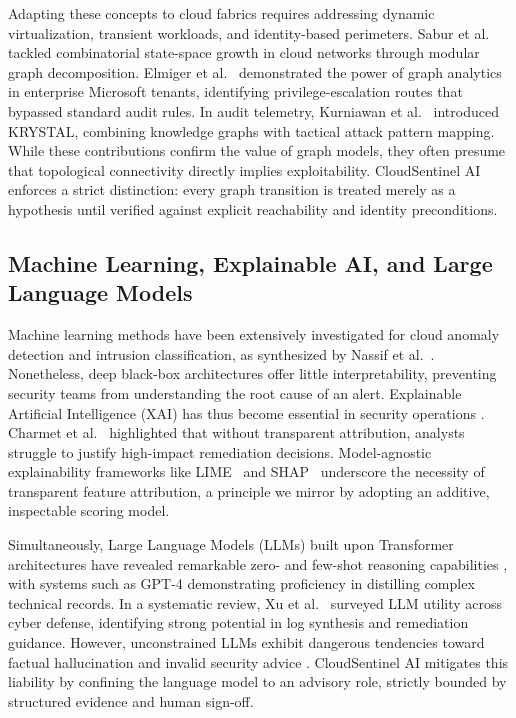 \documentclass[conference]{IEEEtran}
\begin{document}
Adapting these concepts to cloud fabrics requires addressing dynamic virtualization, transient workloads, and identity-based perimeters. Sabur et al.~\cite{sabur2022scalable} tackled combinatorial state-space growth in cloud networks through modular graph decomposition. Elmiger et al.~\cite{elmiger2023attackpaths} demonstrated the power of graph analytics in enterprise Microsoft tenants, identifying privilege-escalation routes that bypassed standard audit rules. In audit telemetry, Kurniawan et al.~\cite{kurniawan2022krystal} introduced KRYSTAL, combining knowledge graphs with tactical attack pattern mapping. While these contributions confirm the value of graph models, they often presume that topological connectivity directly implies exploitability. CloudSentinel AI enforces a strict distinction: every graph transition is treated merely as a hypothesis until verified against explicit reachability and identity preconditions.

\subsection{Machine Learning, Explainable AI, and Large Language Models}
Machine learning methods have been extensively investigated for cloud anomaly detection and intrusion classification, as synthesized by Nassif et al.~\cite{nassif2021mlcloudsecurity}. Nonetheless, deep black-box architectures offer little interpretability, preventing security teams from understanding the root cause of an alert. Explainable Artificial Intelligence (XAI) has thus become essential in security operations \cite{rjoub2023xai}. Charmet et al.~\cite{charmet2022xai} highlighted that without transparent attribution, analysts struggle to justify high-impact remediation decisions. Model-agnostic explainability frameworks like LIME~\cite{ribeiro2016lime} and SHAP~\cite{lundberg2017shap} underscore the necessity of transparent feature attribution, a principle we mirror by adopting an additive, inspectable scoring model.

Simultaneously, Large Language Models (LLMs) built upon Transformer architectures \cite{vaswani2017attention} have revealed remarkable zero- and few-shot reasoning capabilities \cite{brown2020language}, with systems such as GPT-4 \cite{openai2023gpt4} demonstrating proficiency in distilling complex technical records. In a systematic review, Xu et al.~\cite{xu2024llmcybersecurity} surveyed LLM utility across cyber defense, identifying strong potential in log synthesis and remediation guidance. However, unconstrained LLMs exhibit dangerous tendencies toward factual hallucination and invalid security advice \cite{xu2024llmcybersecurity}. CloudSentinel AI mitigates this liability by confining the language model to an advisory role, strictly bounded by structured evidence and human sign-off.
\end{document}
